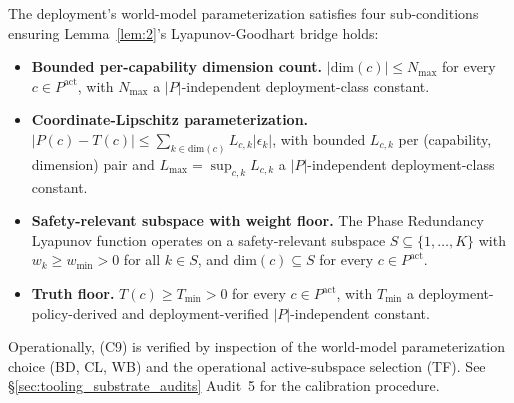 \begin{theorem}
\begin{enumerate}
  The deployment's world-model parameterization satisfies four
  sub-conditions ensuring Lemma~\ref{lem:2}'s Lyapunov-Goodhart
  bridge holds:
  \begin{itemize}
  \item[\textbf{(C9.BD)}] \textbf{Bounded per-capability dimension
    count.}  $|\mathrm{dim}(c)| \leq N_{\max}$ for every $c \in
    P^{\mathrm{act}}$, with $N_{\max}$ a $|P|$-independent
    deployment-class constant.
  \item[\textbf{(C9.CL)}] \textbf{Coordinate-Lipschitz
    parameterization.}  $|P(c) - T(c)| \leq \sum_{k \in
    \mathrm{dim}(c)} L_{c,k} |\epsilon_k|$, with bounded $L_{c,k}$
    per (capability, dimension) pair and $L_{\max} = \sup_{c, k}
    L_{c,k}$ a $|P|$-independent deployment-class constant.
  \item[\textbf{(C9.WB)}] \textbf{Safety-relevant subspace with
    weight floor.}  The Phase Redundancy Lyapunov function operates
    on a safety-relevant subspace $S \subseteq \{1, \ldots, K\}$
    with $w_k \geq w_{\min} > 0$ for all $k \in S$, and
    $\mathrm{dim}(c) \subseteq S$ for every $c \in P^{\mathrm{act}}$.
  \item[\textbf{(C9.TF)}] \textbf{Truth floor.}  $T(c) \geq T_{\min}
    > 0$ for every $c \in P^{\mathrm{act}}$, with $T_{\min}$ a
    deployment-policy-derived and deployment-verified
    $|P|$-independent constant.
  \end{itemize}
  Operationally, (C9) is verified by inspection of the world-model
  parameterization choice (BD, CL, WB) and the operational active-subspace
  selection (TF).  See \S\ref{sec:tooling_substrate_audits} Audit~5 for the
  calibration procedure.


\end{enumerate}
\end{theorem}
